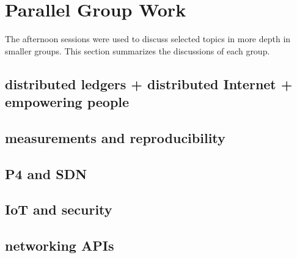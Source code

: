 \section{Parallel Group Work}\label{sec:parallel-group-work}

The afternoon sessions were used to discuss selected topics in more depth in
smaller groups. This section summarizes the discussions of each group.


\subsection{distributed ledgers + distributed Internet + empowering people}

\subsection{measurements and reproducibility}

\subsection{P4 and SDN}

\subsection{IoT and security}

\subsection{networking APIs}
